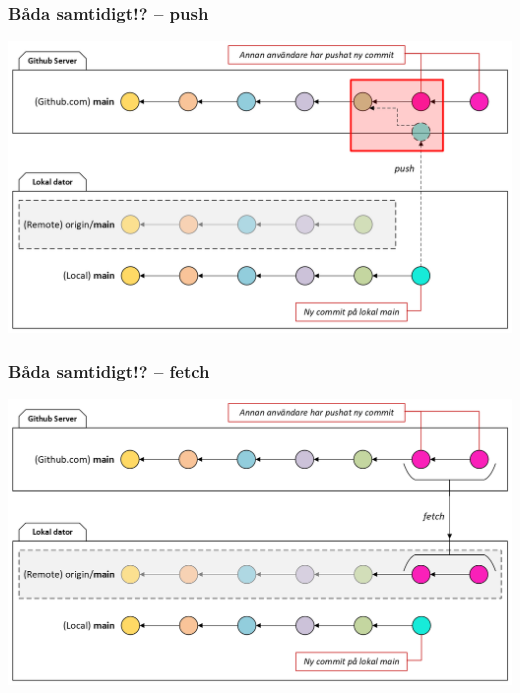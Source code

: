 \begin{frame}
    \frametitle{Båda samtidigt!? -- push}

    \begin{center}
            \includegraphics[width=\textwidth]{figs/local_remote_push_conflict.png}
    \end{center}

\end{frame}

\begin{frame}
    \frametitle{Båda samtidigt!? -- fetch}

    \begin{center}
            \includegraphics[width=\textwidth]{figs/local_remote_fetch_conflict.png}
    \end{center}

\end{frame}

